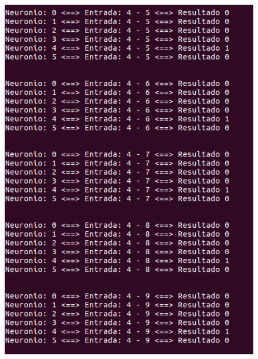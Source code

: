 \documentclass[hidelinks,12pt]{article}
\begin{document}
		\begin{figure}[!h]
			\centering
			\includegraphics[scale=0.5]{Figures/E3S4P2.png}
		\end{figure}
		
\end{document}
